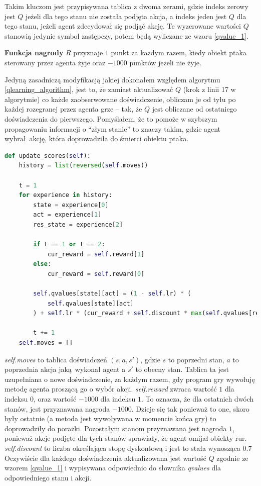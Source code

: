 \documentclass[a4paper, 12pt,oneside]{book}
\begin{document}
Takim kluczom jest przypisywana tablica z dwoma zerami, gdzie
indeks zerowy jest $Q$ jeżeli dla tego stanu nie została podjęta akcja,
a indeks jeden jest $Q$ dla tego stanu, jeżeli agent zdecydował się
podjąć akcję. Te wyzerowane wartości $Q$ stanowią jedynie symbol zastępczy,
potem będą wyliczane ze wzoru \ref{qvalue_1}.

\textbf{Funkcja nagrody} $R$ przyznaje $1$ punkt za każdym razem, kiedy obiekt
ptaka sterowany przez agenta żyje oraz $-1000$ punktów jeżeli nie żyje.

Jedyną zasadniczą modyfikacją jakiej dokonałem względem algorytmu
\ref{qlearning_algorithm}, jest to, że zamiast aktualizować $Q$ (krok z linii
17 w algorytmie) co każde zaobserwowane doświadczenie, obliczam je od tyłu po
każdej rozegranej przez agenta grze -- tak, że $Q$ jest obliczane od ostatniego
doświadczenia do pierwszego. Pomyślałem, że to pomoże w szybszym propagowaniu
informacji o ``złym stanie'' to znaczy takim, gdzie agent wybrał akcję, która
doprowadziła do śmierci obiektu ptaka. 
\begin{lstlisting}[language=Python, label={qlearning_python},
caption={Zaimplementowany algorytm Q-Learning}]
def update_scores(self):
    history = list(reversed(self.moves))

    t = 1
    for experience in history:
        state = experience[0]
        act = experience[1]
        res_state = experience[2]

        if t == 1 or t == 2:
            cur_reward = self.reward[1]
        else:
            cur_reward = self.reward[0]

        self.qvalues[state][act] = (1 - self.lr) * (
            self.qvalues[state][act]
        ) + self.lr * (cur_reward + self.discount * max(self.qvalues[res_state]))

        t += 1
    self.moves = []
\end{lstlisting}
\textit{self.moves} to tablica doświadczeń $(s, a, s')$, gdzie $s$ to poprzedni
stan, $a$ to poprzednia akcja jaką wykonał agent a $s'$ to obecny stan. Tablica
ta jest uzupełniana o nowe doświadczenie, za każdym razem, gdy program gry 
wywołuję metodę agenta proszącą go o wybór akcji. \textit{self.reward} zwraca
wartość $1$ dla indeksu $0$, oraz wartość $-1000$ dla indeksu $1$. To oznacza,
że dla ostatnich dwóch stanów, jest przyznawana nagroda $-1000$. Dzieje się tak
ponieważ to one, skoro były ostatnie (a metoda jest wywoływana w momencie końca
gry) to doprowadziły do porażki. Pozostałym stanom przyznawana jest nagroda
$1$, ponieważ akcje podjęte dla tych stanów sprawiały, że agent omijał obiekty
rur. \textit{self.discount} to liczba określająca stopę dyskontową i jest to
stała wynosząca $0.7$ Oczywiście dla każdego doświadczenia aktualizowana jest
wartość $Q$ zgodnie ze wzorem \ref{qvalue_1} i wypisywana odpowiednio do
słownika \textit{qvalues} dla odpowiedniego stanu i akcji. 
\end{document}
